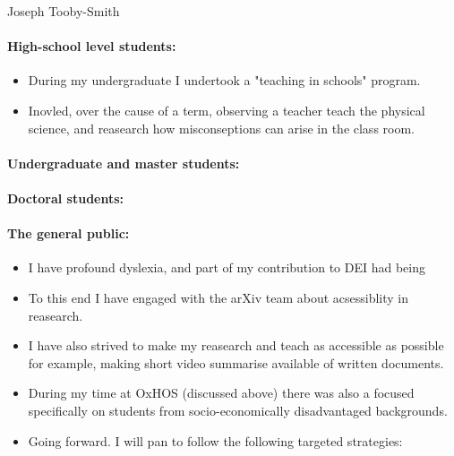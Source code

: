 \documentclass[14pt,letter]{article}
\newcounter{customtitle}
\begin{document}
\vspace{-1cm}
\begin{flushright}
{{\Large \color{white}Joseph Tooby-Smith}}
\end{flushright}
\vspace{0.4cm}
\vspace{0.3cm}
\paragraph{High-school level students:} 
\begin{itemize}
\item During my undergraduate I undertook a "teaching in schools" program. 
\item Inovled, over the cause of a term, observing a teacher teach 
the physical science, and reasearch how misconseptions can arise in the 
class room.
\end{itemize}

\paragraph{Undergraduate and master students:} 

\paragraph{Doctoral students:} 

\paragraph{The general public:} 

\begin{itemize}
\itemn I have a commitment promoting diversity, equality and inclusivity 
in the classroom and academia in general. 
\item I have profound dyslexia, and part of my contribution to DEI 
	had being 
\item To this end I have engaged with the arXiv team about acsessiblity 
in reasearch. 
\item I have also strived to make my reasearch and teach as accessible as possible
for example, making short video summarise available of written documents. 
\item During my time at OxHOS (discussed above) there was also a focused 
specifically on students from socio-economically disadvantaged backgrounds. 
\item Going forward. I will pan to follow the following targeted strategies: 
\end{itemize} 
\end{document}
